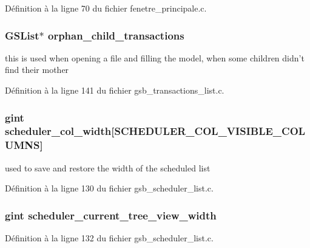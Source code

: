 Définition à la ligne 70 du fichier fenetre\_\-principale.c.

\subsubsection[{orphan\_\-child\_\-transactions}]{\setlength{\rightskip}{0pt plus 5cm}GSList$\ast$ {\bf orphan\_\-child\_\-transactions}}\label{traitement__variables_8c_ac2f7ca891d6c3a7cfb5c8df02918cf7c}
this is used when opening a file and filling the model, when some children didn't find their mother 

Définition à la ligne 141 du fichier gsb\_\-transactions\_\-list.c.

\subsubsection[{scheduler\_\-col\_\-width}]{\setlength{\rightskip}{0pt plus 5cm}gint {\bf scheduler\_\-col\_\-width}[SCHEDULER\_\-COL\_\-VISIBLE\_\-COLUMNS]}\label{traitement__variables_8c_a8278ca506ea616623cd8cdc764188ee9}
used to save and restore the width of the scheduled list 

Définition à la ligne 130 du fichier gsb\_\-scheduler\_\-list.c.

\subsubsection[{scheduler\_\-current\_\-tree\_\-view\_\-width}]{\setlength{\rightskip}{0pt plus 5cm}gint {\bf scheduler\_\-current\_\-tree\_\-view\_\-width}}\label{traitement__variables_8c_afa241b31ec5f7f4750793852e3f49eeb}


Définition à la ligne 132 du fichier gsb\_\-scheduler\_\-list.c.

